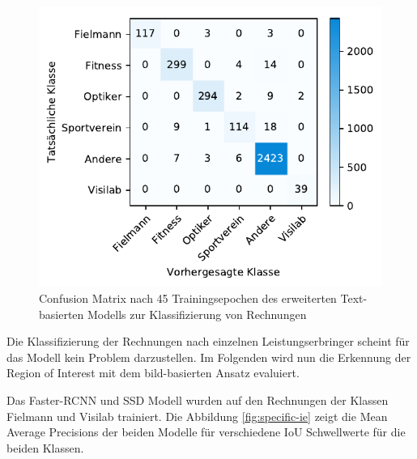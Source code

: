 \begin{figure}[h!] 
    \captionsetup{width=.9\linewidth}
    \caption{Confusion Matrix nach 45 Trainingsepochen des erweiterten Text-basierten Modells zur Klassifizierung von Rechnungen}
    \label{fielmann-cm}
    \centering
    \includegraphics[scale=1]{graphics/matplot/class__fielmann__cm_44.pdf}
\end{figure}

Die Klassifizierung der Rechnungen nach einzelnen Leistungserbringer scheint für das Modell kein Problem darzustellen. Im Folgenden wird nun die Erkennung der Region of Interest mit dem bild-basierten Ansatz evaluiert.

Das Faster-RCNN und SSD Modell wurden auf den Rechnungen der Klassen Fielmann und Visilab trainiert. Die Abbildung \ref{fig:specific-ie} zeigt die Mean Average Precisions der beiden Modelle für verschiedene IoU Schwellwerte für die beiden Klassen.

